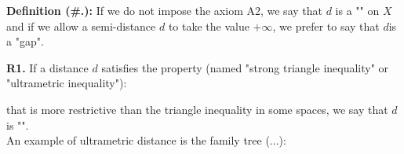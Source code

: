 	\textbf{Definition (\#\thesection.\mydef):} If we do not impose the axiom A2, we say that $d$ is a "" on $X$ and if we allow a semi-distance $d$ to take the value $+\infty$, we prefer to say that $d$is a "gap".
	\begin{tcolorbox}[title=Remarks,arc=10pt,breakable,drop lifted shadow,
  skin=enhanced,
  skin first is subskin of={enhancedfirst}{arc=10pt,no shadow},
  skin middle is subskin of={enhancedmiddle}{arc=10pt,no shadow},
  skin last is subskin of={enhancedlast}{drop lifted shadow}]
		\textbf{R1.} If a distance $d$ satisfies the property (named "strong triangle inequality" or "ultrametric inequality"):
		
		that is more restrictive than the triangle inequality in some spaces, we say that $d$ is "".\\
		
		An example of ultrametric distance is the family tree (...):
		
		\begin{figure}[H]
			\centering
			
			\begin{tikzpicture}[x=0.75pt,y=0.75pt,yscale=-1,xscale=1]
			

\end{tikzpicture}
\end{figure}
\end{tcolorbox}
